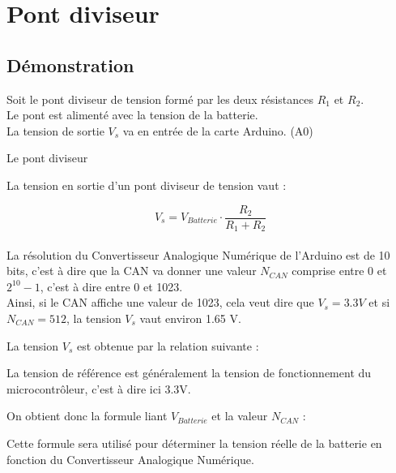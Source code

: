 \chapter{Pont diviseur}


\section{Démonstration}

Soit le pont diviseur de tension formé par les deux résistances $R_1$ et $R_2$.\\
Le pont est alimenté avec la tension de la batterie.\\
La tension de sortie $V_s$ va en entrée de la carte Arduino. (A0)


\begin{schema}{Le pont diviseur}
 \end{schema}


La tension en sortie d'un pont diviseur de tension vaut :

 $$ V_s = V_{Batterie} \cdot \frac{R_2}{R_1+R_2} $$\\

 La résolution du Convertisseur Analogique Numérique de l'Arduino est de 10 bits, c'est à dire que la CAN va donner une valeur $N_{CAN}$ comprise entre 0 et $2^{10}-1$, c'est à dire entre 0 et 1023.\\

 Ainsi, si le CAN affiche une valeur de 1023, cela veut dire que $V_s=3.3V$ et si $N_{CAN}=512$, la tension $V_s$ vaut environ 1.65 V.


 La tension $V_s$ est obtenue par la relation suivante : 


 La tension de référence est généralement la tension de fonctionnement du microcontrôleur, c'est à dire ici 3.3V.

 On obtient donc la formule liant $V_{Batterie}$ et la valeur $N_{CAN}$ :



 Cette formule sera utilisé pour déterminer la tension réelle de la batterie en fonction du Convertisseur Analogique Numérique.


